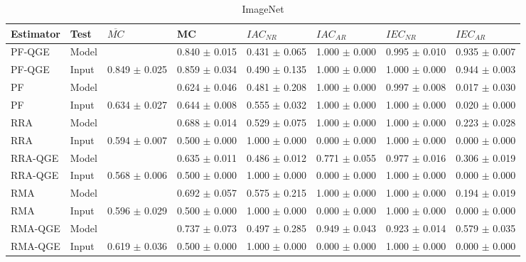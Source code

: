 \newpage
\begin{table}
\caption{ImageNet}
\label{table-meta-eval-ImageNet}
\begin{tabular}{llllllll}
\toprule
Estimator & Test & $\overline{MC}$ & MC & $IAC_{NR}$ & $IAC_{AR}$ & $IEC_{NR}$ & $IEC_{AR}$ \\
\midrule
PF-QGE & Model &  & 0.840 $\pm$ 0.015 & 0.431 $\pm$ 0.065 & 1.000 $\pm$ 0.000 & 0.995 $\pm$ 0.010 & 0.935 $\pm$ 0.007 \\
PF-QGE & Input & 0.849 $\pm$ 0.025 & 0.859 $\pm$ 0.034 & 0.490 $\pm$ 0.135 & 1.000 $\pm$ 0.000 & 1.000 $\pm$ 0.000 & 0.944 $\pm$ 0.003 \\
PF & Model &  & 0.624 $\pm$ 0.046 & 0.481 $\pm$ 0.208 & 1.000 $\pm$ 0.000 & 0.997 $\pm$ 0.008 & 0.017 $\pm$ 0.030 \\
PF & Input & 0.634 $\pm$ 0.027 & 0.644 $\pm$ 0.008 & 0.555 $\pm$ 0.032 & 1.000 $\pm$ 0.000 & 1.000 $\pm$ 0.000 & 0.020 $\pm$ 0.000 \\
RRA & Model &  & 0.688 $\pm$ 0.014 & 0.529 $\pm$ 0.075 & 1.000 $\pm$ 0.000 & 1.000 $\pm$ 0.000 & 0.223 $\pm$ 0.028 \\
RRA & Input & 0.594 $\pm$ 0.007 & 0.500 $\pm$ 0.000 & 1.000 $\pm$ 0.000 & 0.000 $\pm$ 0.000 & 1.000 $\pm$ 0.000 & 0.000 $\pm$ 0.000 \\
RRA-QGE & Model &  & 0.635 $\pm$ 0.011 & 0.486 $\pm$ 0.012 & 0.771 $\pm$ 0.055 & 0.977 $\pm$ 0.016 & 0.306 $\pm$ 0.019 \\
RRA-QGE & Input & 0.568 $\pm$ 0.006 & 0.500 $\pm$ 0.000 & 1.000 $\pm$ 0.000 & 0.000 $\pm$ 0.000 & 1.000 $\pm$ 0.000 & 0.000 $\pm$ 0.000 \\
RMA & Model &  & 0.692 $\pm$ 0.057 & 0.575 $\pm$ 0.215 & 1.000 $\pm$ 0.000 & 1.000 $\pm$ 0.000 & 0.194 $\pm$ 0.019 \\
RMA & Input & 0.596 $\pm$ 0.029 & 0.500 $\pm$ 0.000 & 1.000 $\pm$ 0.000 & 0.000 $\pm$ 0.000 & 1.000 $\pm$ 0.000 & 0.000 $\pm$ 0.000 \\
RMA-QGE & Model &  & 0.737 $\pm$ 0.073 & 0.497 $\pm$ 0.285 & 0.949 $\pm$ 0.043 & 0.923 $\pm$ 0.014 & 0.579 $\pm$ 0.035 \\
RMA-QGE & Input & 0.619 $\pm$ 0.036 & 0.500 $\pm$ 0.000 & 1.000 $\pm$ 0.000 & 0.000 $\pm$ 0.000 & 1.000 $\pm$ 0.000 & 0.000 $\pm$ 0.000 \\
\bottomrule
\end{tabular}
\end{table}

